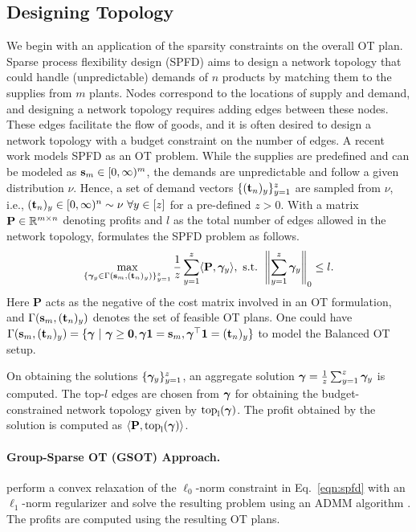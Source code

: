 \subsection{Designing Topology}\label{gensparseexp}
We begin with an application of the sparsity constraints on the overall OT plan. 
Sparse process flexibility design (SPFD) aims to design a network topology that could handle (unpredictable) demands of $n$ products by matching them to the supplies from  $m$ plants. Nodes correspond to the locations of supply and demand, and designing a network topology requires adding edges between these nodes. These edges facilitate the flow of goods, and it is often desired to design a network topology with a budget constraint on the number of edges. A recent work \citep{ijcai2023p679} models SPFD as an OT problem. While the supplies are predefined and can be modeled as $\mathbf{s}_m\in [0, \infty)^m$, the demands are unpredictable and follow a given distribution $\nu$. Hence, a set of demand vectors $\{(\mathbf{t}_n)_y\}_{y=1}^z$ are sampled from $\nu$, i.e., $(\bnu)_y\in [0, \infty)^n \sim \nu \ \forall y\in [z]$ for a pre-defined $z>0$. With a matrix $\mathbf{P}\in \mathbb{R}^{m\times n}$ denoting profits and $l$ as the total number of edges allowed in the network topology,
\citet[Eq. (3)]{ijcai2023p679} formulates the SPFD problem as follows.
\begin{equation}\label{eqn:spfd}
\max\limits_{ \{ \bm{\gamma}_y\in \Gamma(\mathbf{s}_m, (\mathbf{t}_n)_y)\}_{y=1}^z}\frac{1}{z}\sum_{y=1}^z\langle\mathbf{P}, \bm{\gamma}_y\rangle,
\ \textup{s.t. }\left\|\sum_{y=1}^z \bm{\gamma}_y\right\|_0\leq l.
\end{equation}
Here $\mathbf{P}$ acts as the negative of the cost matrix involved in an OT formulation, and $\Gamma(\mathbf{s}_m, (\mathbf{t}_n)_y)$ denotes the set of feasible OT plans. One could have $\Gamma(\mathbf{s}_m, (\mathbf{t}_n)_y)=\{\bm{\gamma}~|~\bm{\gamma}\ge \mathbf{0}, \bm{\gamma} \mathbf{1} = \mathbf{s}_m, \bm{\gamma}^\top \mathbf{1} = (\mathbf{t}_n)_y\}$ to model the Balanced OT setup.

On obtaining the solutions $\{\bm{\gamma}_y\}_{y=1}^z$, an aggregate solution $\bm{\gamma}=\frac{1}{z}\sum_{y=1}^z\bm{\gamma}_y$ is computed. The top-$l$ edges are chosen from $\bm{\gamma}$ for obtaining the budget-constrained network topology given by $\rm{top}_l(\bm{\gamma})$. The profit obtained by the solution is computed as $\langle \mathbf{P}, \rm{top}_l(\bm{\gamma}) \rangle$.

\paragraph{Group-Sparse OT (GSOT) Approach.} \citet{ijcai2023p679} perform a convex relaxation of the $\ell_0$-norm constraint in Eq.~\ref{eqn:spfd} with an $\ell_1$-norm regularizer and solve the resulting problem using an ADMM algorithm \citep{admm}. The profits are computed using the resulting OT plans.

